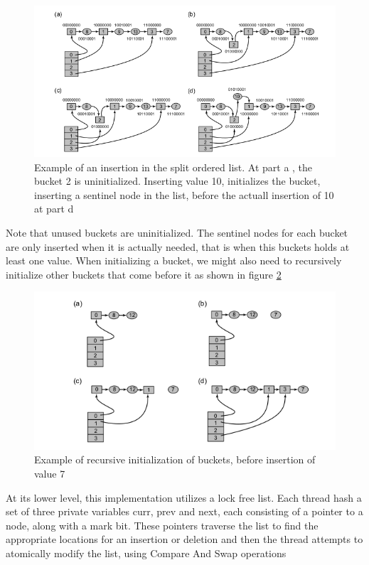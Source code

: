 \begin{figure}
 \centering
  \includegraphics[scale=0.5]{split_ordered_2.png}
\caption{Example of an insertion in the split ordered list. At part a , the bucket 2 is uninitialized. Inserting value 10, initializes the bucket, inserting a sentinel node in the list, before the actuall insertion of 10 at part d}
\label{split_ordered_2}
\end{figure}

Note that unused buckets are uninitialized. The sentinel nodes for each bucket are only inserted when it is actually needed, that is when this buckets holds at least one value. When initializing a bucket, we might also need to recursively initialize other buckets that come before it as shown in figure \ref{split_ordered_3}

\begin{figure}
 \centering
  \includegraphics[scale=0.5]{split_ordered_3.png}
\caption{Example of recursive initialization of buckets, before insertion of value 7}
\label{split_ordered_3}
\end{figure}

At its lower level, this implementation utilizes a lock free list. Each thread hash a set of three private variables curr, prev and next, each consisting of a pointer to a node, along with a mark bit. These pointers traverse the list to find the appropriate locations for an insertion or deletion and then the thread attempts to atomically modify the list, using Compare And Swap operations

